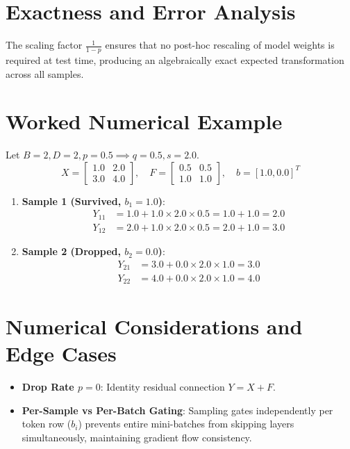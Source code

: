 \documentclass[11pt,a4paper]{article}
\theoremstyle{definition}
\begin{document}
\section{Exactness and Error Analysis}

The scaling factor $\frac{1}{1-p}$ ensures that no post-hoc rescaling of model weights is required at test time, producing an algebraically exact expected transformation across all samples.

\section{Worked Numerical Example}

Let $B = 2, D = 2, p = 0.5 \implies q = 0.5, s = 2.0$.
\begin{equation}
X = \begin{bmatrix} 1.0 & 2.0 \\ 3.0 & 4.0 \end{bmatrix}, \quad F = \begin{bmatrix} 0.5 & 0.5 \\ 1.0 & 1.0 \end{bmatrix}, \quad b = [1.0, 0.0]^T
\end{equation}

\begin{enumerate}
    \item \textbf{Sample 1 (Survived, $b_1 = 1.0$)}:
    \begin{align}
    Y_{11} &= 1.0 + 1.0 \times 2.0 \times 0.5 = 1.0 + 1.0 = 2.0 \\
    Y_{12} &= 2.0 + 1.0 \times 2.0 \times 0.5 = 2.0 + 1.0 = 3.0
    \end{align}
    \item \textbf{Sample 2 (Dropped, $b_2 = 0.0$)}:
    \begin{align}
    Y_{21} &= 3.0 + 0.0 \times 2.0 \times 1.0 = 3.0 \\
    Y_{22} &= 4.0 + 0.0 \times 2.0 \times 1.0 = 4.0
    \end{align}
\end{enumerate}

\section{Numerical Considerations and Edge Cases}

\begin{itemize}
    \item \textbf{Drop Rate $p = 0$}: Identity residual connection $Y = X + F$.
    \item \textbf{Per-Sample vs Per-Batch Gating}: Sampling gates independently per token row ($b_i$) prevents entire mini-batches from skipping layers simultaneously, maintaining gradient flow consistency.
\end{itemize}
\end{document}
